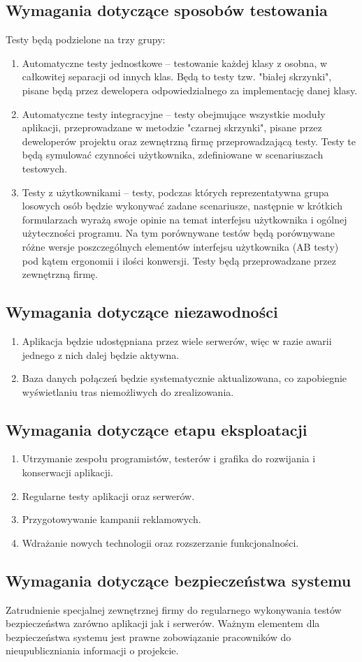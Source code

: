 \documentclass[12pt,a4paper]{report}
\begin{document}
\subsection{Wymagania dotyczące sposobów testowania}
Testy będą podzielone na trzy grupy:
\begin{enumerate}
	\item Automatyczne testy jednostkowe -- testowanie każdej klasy z osobna, w całkowitej separacji od innych klas. Będą to testy tzw. "białej skrzynki", pisane będą przez dewelopera odpowiedzialnego za implementację danej klasy.
	\item Automatyczne testy integracyjne -- testy obejmujące wszystkie moduły aplikacji, przeprowadzane w metodzie "czarnej skrzynki", pisane przez deweloperów projektu oraz zewnętrzną firmę przeprowadzającą testy. Testy te będą symulować czynności użytkownika, zdefiniowane w scenariuszach testowych.
	\item Testy z użytkownikami -- testy, podczas których reprezentatywna grupa losowych osób będzie wykonywać zadane scenariusze, następnie w krótkich formularzach wyrażą swoje opinie na temat interfejsu użytkownika i ogólnej użyteczności programu. Na tym porównywane testów będą porównywane różne wersje poszczególnych elementów interfejsu użytkownika (AB testy) pod kątem ergonomii i ilości konwersji. Testy będą przeprowadzane przez zewnętrzną firmę.
\end{enumerate}
\subsection{Wymagania dotyczące niezawodności}
\begin{enumerate}
	\item Aplikacja będzie udostępniana przez wiele serwerów, więc w razie awarii jednego z nich dalej będzie aktywna.
	\item Baza danych połączeń będzie systematycznie aktualizowana, co zapobiegnie wyświetlaniu tras niemożliwych do zrealizowania.
\end{enumerate}
\subsection{Wymagania dotyczące etapu eksploatacji}
\begin{enumerate}
	\item Utrzymanie zespołu programistów, testerów i grafika do rozwijania i konserwacji aplikacji.
	\item Regularne testy aplikacji oraz serwerów.
	\item Przygotowywanie kampanii reklamowych.
	\item Wdrażanie nowych technologii oraz rozszerzanie funkcjonalności.
\end{enumerate}	
\subsection{Wymagania dotyczące bezpieczeństwa systemu}
	Zatrudnienie specjalnej zewnętrznej firmy do regularnego wykonywania testów bezpieczeństwa zarówno aplikacji jak i serwerów. Ważnym elementem dla bezpieczeństwa systemu jest prawne zobowiązanie pracowników do nieupubliczniania informacji o projekcie.
\end{document}
